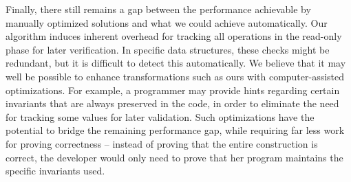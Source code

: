 Finally, there still remains a gap between the performance achievable by manually optimized solutions and what we could achieve automatically. Our algorithm induces inherent overhead for tracking all operations in the read-only phase for later verification.
In specific data structures, these checks might be redundant, but it is difficult  to detect this automatically. We believe that
it may well be possible to enhance  transformations such as ours with computer-assisted optimizations. For example, a programmer may provide hints regarding certain
invariants that are always preserved in the code, in order to eliminate the need for tracking some values for later
validation. Such optimizations have the potential to bridge the remaining performance gap, while requiring far less work
for proving correctness -- instead of proving that the entire construction is correct, the developer would only need to
prove that her program maintains the specific invariants used.
